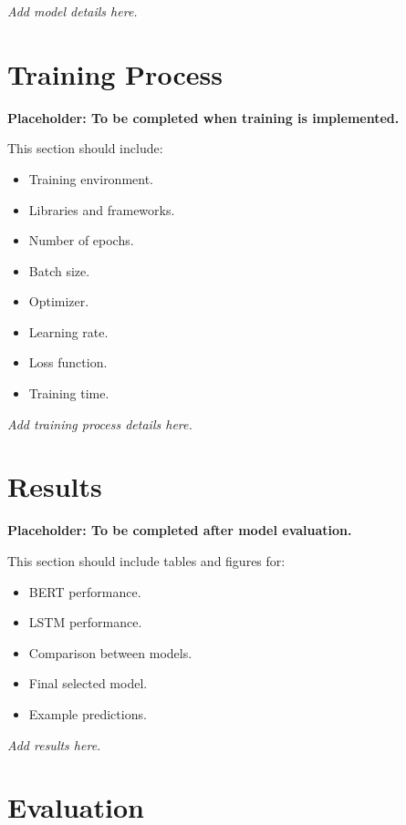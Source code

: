 \documentclass[12pt,a4paper]{article}
\begin{document}
\vspace{2cm}
\noindent\textit{Add model details here.}

\section{Training Process}

\textbf{Placeholder: To be completed when training is implemented.}

This section should include:

\begin{itemize}
    \item Training environment.
    \item Libraries and frameworks.
    \item Number of epochs.
    \item Batch size.
    \item Optimizer.
    \item Learning rate.
    \item Loss function.
    \item Training time.
\end{itemize}

\vspace{2cm}
\noindent\textit{Add training process details here.}

\section{Results}

\textbf{Placeholder: To be completed after model evaluation.}

This section should include tables and figures for:

\begin{itemize}
    \item BERT performance.
    \item LSTM performance.
    \item Comparison between models.
    \item Final selected model.
    \item Example predictions.
\end{itemize}

\vspace{2cm}
\noindent\textit{Add results here.}

\section{Evaluation}
\end{document}
